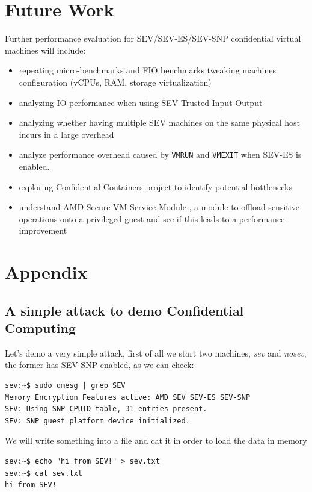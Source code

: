 \documentclass[twocolumn]{article}
\begin{document}
\section{Future Work}
Further performance evaluation for SEV/SEV-ES/SEV-SNP confidential virtual machines will include:

\begin{itemize}
    \item repeating micro-benchmarks and FIO benchmarks tweaking machines configuration (vCPUs, RAM, storage virtualization)
    \item analyzing IO performance when using SEV Trusted Input Output \cite{tio}
    \item analyzing whether having multiple SEV machines on the same physical host incurs in a large overhead
    \item analyze performance overhead caused by \texttt{VMRUN} and \texttt{VMEXIT} when SEV-ES is enabled.
    \item exploring Confidential Containers \cite{coco} project to identify potential bottlenecks
    \item understand AMD Secure VM Service Module \cite{svsm}, a module to offload sensitive operations onto a privileged guest and see if this leads to a performance improvement
\end{itemize}

    
\printbibliography
\appendix

\section{Appendix}
\subsection{A simple attack to demo Confidential Computing}
Let's demo a very simple attack, first of all we start two machines, \textit{sev} and \textit{nosev}, the former has SEV-SNP enabled, as we can check:

\begin{verbatim}
sev:~$ sudo dmesg | grep SEV
Memory Encryption Features active: AMD SEV SEV-ES SEV-SNP
SEV: Using SNP CPUID table, 31 entries present.
SEV: SNP guest platform device initialized.
\end{verbatim}

We will write something into a file and cat it in order to load the data in memory

\begin{verbatim}
sev:~$ echo "hi from SEV!" > sev.txt
sev:~$ cat sev.txt
hi from SEV!
\end{verbatim}
\end{document}
